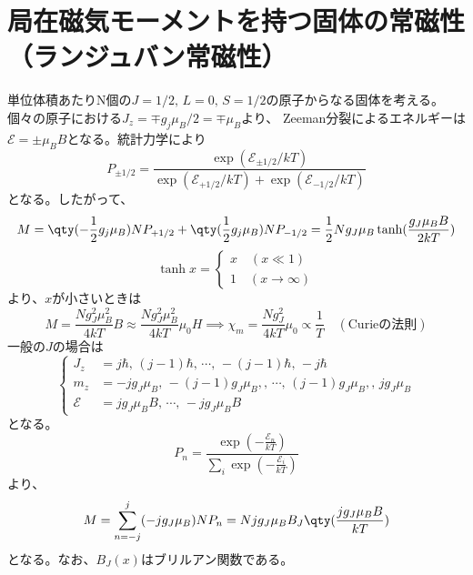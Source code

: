 \section{局在磁気モーメントを持つ固体の常磁性（ランジュバン常磁性）}
単位体積あたりN個の$J=1/2,\,L=0,\,S=1/2$の原子からなる固体を考える。個々の原子における$J_z = \mp{}g_j\mu_B/2=\mp\mu_B$より、
Zeeman分裂によるエネルギーは$\mathcal{E} = \pm\mu_BB$となる。統計力学により
\begin{equation}
	P_{\pm1/2} = \frac{\exp(\mathcal{E}_{\pm1/2}/kT)}{\exp(\mathcal{E}_{+1/2}/kT) + \exp(\mathcal{E}_{-1/2}/kT)}
\end{equation}
となる。したがって、
\begin{equation}
	M = \qty(-\frac{1}{2}g_j\mu_B)NP_{+1/2} + \qty(\frac{1}{2}g_j\mu_B)NP_{-1/2} = \frac{1}{2}Ng_J\mu_B\tanh(\frac{g_J\mu_BB}{2kT})
\end{equation}
\begin{equation}
	\tanh{x}=\begin{cases}
		x\quad(x\ll 1) \\
		1\quad(x\to\infty)
	\end{cases}
\end{equation}
より、$x$が小さいときは
\begin{equation}
	M = \frac{Ng_J^2\mu_B^2}{4kT}B\approx \frac{Ng_J^2\mu_B^2}{4kT}\mu_0H\implies \chi_m = \frac{Ng_J^2}{4kT}\mu_0 \propto \frac{1}{T}\quad(\text{Curieの法則})
\end{equation}
一般の$J$の場合は
\begin{equation}
	\begin{cases}
		J_z         & = j\hbar,\,(j-1)\hbar,\,\cdots,\,-(j-1)\hbar,\,-j\hbar               \\
		m_z         & = -jg_J\mu_B,\,-(j-1)g_J\mu_B,,\,\cdots,\,(j-1)g_J\mu_B,,\,jg_J\mu_B \\
		\mathcal{E} & = jg_J\mu_BB,\,\cdots,\,-jg_J\mu_BB
	\end{cases}
\end{equation}
となる。
\begin{equation}
	P_n = \frac{\exp(-\frac{\mathcal{E}_n}{kT})}{\sum_i\exp(-\frac{\mathcal{E}_i}{kT})}
\end{equation}
より、
\begin{equation}
	M = \sum_{n=-j}^j(-jg_J\mu_B)NP_n = Njg_J\mu_BB_J\qty(\frac{jg_J\mu_BB}{kT})
\end{equation}
となる。なお、$B_J(x)$はブリルアン関数である。
